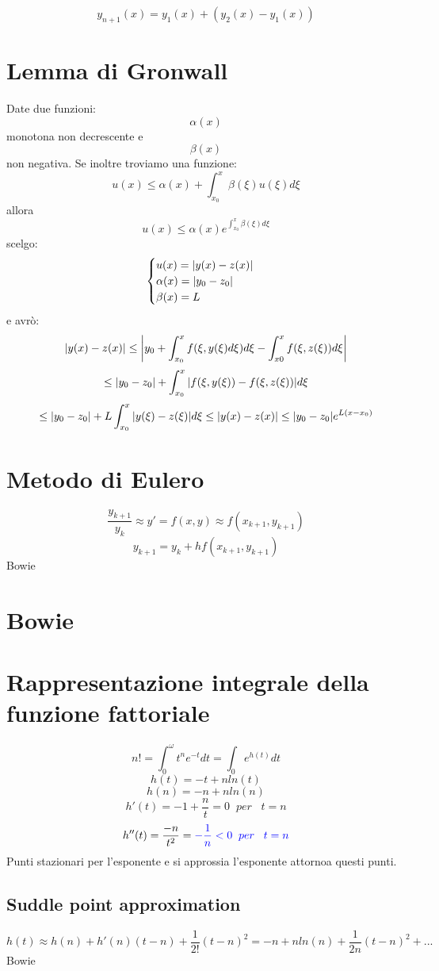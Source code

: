 \[y_{n+1}(x)=y_1(x)+(y_2(x)-y_1(x))\]

\section{Lemma di Gronwall}
Date due funzioni:
\[\alpha(x)\] monotona non decrescente 
e
\[\beta(x)\] non negativa.
Se inoltre troviamo una funzione:
\[u(x) \le \alpha(x)+\int_{x_0}^{x}\beta(\xi)u(\xi)d\xi\] allora
\[ u(x) \le \alpha(x) e^{\int_{x_0}^{x}\beta(\xi)d\xi}\]
scelgo:
\[\begin{cases}
   u(x)= \absolutevalue{y(x)-z(x)}\\
   \alpha(x)=\absolutevalue{y_0-z_0}\\
   \beta(x)=L\\
\end{cases}\]
e avrò:
\[ \absolutevalue{y(x)-z(x)} \le \absolutevalue{y_0+ \int_{x_0}^{x}f(\xi,y(\xi)d\xi)d\xi-\int_{x0}^{x}f(\xi,z(\xi))d\xi}\]
\[\le \absolutevalue{y_0-z_0}+\int_{x_0}^{x}\absolutevalue{f(\xi,y(\xi))-f(\xi,z(\xi))}d\xi\]
\[\le \absolutevalue{y_0-z_0}+L\int_{x_0}^{x}\absolutevalue{y(\xi)-z(\xi)}d\xi\le \absolutevalue{y(x)-z(x)} \le \absolutevalue{y_0-z_0}e^{L(x-x_0)}\]

\section{Metodo di Eulero}
\[ \frac{y_{k+1}}{y_k} \approx y' = f(x,y) \approx f(x_{k+1},y_{k+1})\]
\[y_{k+1}=y_k+hf(x_{k+1},y_{k+1})\]
Bowie

\section{Bowie}

\section{Rappresentazione integrale della funzione fattoriale}
\[n!=\int_{0}^{\omega}t^{n} e^{-t}dt=\int_{0}e^{h(t)}dt\]
\[h(t)=-t+ n ln(t)\]
\[h(n)=-n+ n ln(n)\]
\[h'(t)=-1+\frac{n}{t} =0 \;\; per \;\;\; t=n\]
\[h''(t)=\frac{-n}{t^2}=\textcolor{blue}{-\frac{1}{n} <0 \;\; per \;\;\; t=n}\]
Punti stazionari per l'esponente e si approssia l'esponente attornoa questi punti.
\subsection{Suddle point approximation}
\[h(t) \approx h(n)+h'(n)(t-n)+\frac{1}{2!}(t-n)^2=-n+nln(n)+\frac{1}{2n}(t-n)^2+...\]
Bowie

